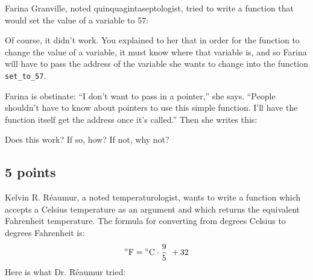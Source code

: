 Farina Granville, noted quinquagintaseptologist, tried to write a
function that would set the value of a variable to 57:

\begin{flushleft}
\verb% void set_to_57(int var)% \\*
\verb% { % \\*
\verb%   var = 57;% \\*
\verb% }% \\*
\end{flushleft}

Of course, it didn't work.  You explained to her that in order for the
function to change the value of a variable, it must know where that
variable is, and so Farina will have to pass the address of the variable
she wants to change into the function {\tt set\_to\_57}.

Farina is obstinate:  ``I don't want to pass in a pointer,'' she says.
``People shouldn't have to know about pointers to use this simple
function.  I'll have the function itself get the address once it's
called.'' Then she writes this:

\begin{flushleft}
\verb% void set_to_57(int var)% \\*
\verb% {% \\*
\verb%   int *p;      /* Address of argument */% \\*
\verb% % \\*
\verb%   p = &var;% \\*
\verb%   *p = 57; % \\*
\verb% } % \\*
\end{flushleft}

Does this work?  If so, how?  If not, why not?



\subsection{5 points}

Kelvin R. R\'eaumur, a noted temperaturologist, wants to write a
function which accepts a Celsius temperature as an argument and which
returns the equivalent Fahrenheit temperature.  The formula for
converting from degrees Celsius to degrees Fahrenheit is:
\[ ^\circ{\rm F} = {^\circ{\rm C}}\cdot{9\over 5}\ + 32 \]
Here is what Dr. R\'eaumur tried:

\begin{flushleft}
\verb% double celsius_to_fahrenheit(double c)% \\*
\verb% {% \\*
\verb%   double f;% \\*
\verb% % \\*
\verb%   f = c * (9/5) + 32;% \\*
\verb%   return f;% \\*
\verb% }% \\*
\end{flushleft}

